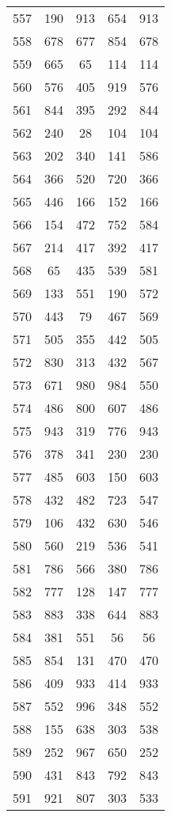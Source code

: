 \documentclass[a4paper,10pt,ngerman]{scrartcl}
\begin{document}
\begin{longtable}[c]{c|c|c|c|c}
    557 & 190 & 913 & 654 & 913 \\
    558 & 678 & 677 & 854 & 678 \\
    559 & 665 & 65 & 114 & 114 \\
    560 & 576 & 405 & 919 & 576 \\
    561 & 844 & 395 & 292 & 844 \\
    562 & 240 & 28 & 104 & 104 \\
    563 & 202 & 340 & 141 & 586 \\
    564 & 366 & 520 & 720 & 366 \\
    565 & 446 & 166 & 152 & 166 \\
    566 & 154 & 472 & 752 & 584 \\
    567 & 214 & 417 & 392 & 417 \\
    568 & 65 & 435 & 539 & 581 \\
    569 & 133 & 551 & 190 & 572 \\
    570 & 443 & 79 & 467 & 569 \\
    571 & 505 & 355 & 442 & 505 \\
    572 & 830 & 313 & 432 & 567 \\
    573 & 671 & 980 & 984 & 550 \\
    574 & 486 & 800 & 607 & 486 \\
    575 & 943 & 319 & 776 & 943 \\
    576 & 378 & 341 & 230 & 230 \\
    577 & 485 & 603 & 150 & 603 \\
    578 & 432 & 482 & 723 & 547 \\
    579 & 106 & 432 & 630 & 546 \\
    580 & 560 & 219 & 536 & 541 \\
    581 & 786 & 566 & 380 & 786 \\
    582 & 777 & 128 & 147 & 777 \\
    583 & 883 & 338 & 644 & 883 \\
    584 & 381 & 551 & 56 & 56 \\
    585 & 854 & 131 & 470 & 470 \\
    586 & 409 & 933 & 414 & 933 \\
    587 & 552 & 996 & 348 & 552 \\
    588 & 155 & 638 & 303 & 538 \\
    589 & 252 & 967 & 650 & 252 \\
    590 & 431 & 843 & 792 & 843 \\
    591 & 921 & 807 & 303 & 533 \\

\end{longtable}
\end{document}
